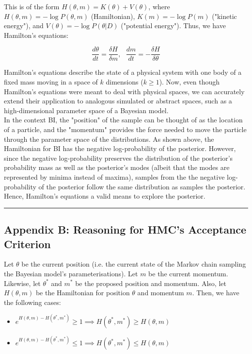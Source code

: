 \documentclass[conference]{IEEEtran}
\begin{document}
This is of the form $H(\theta, m) = K(\theta) + V(\theta)$, where $H(\theta, m) = - \log P(\theta, m)$ (Hamiltonian),  $K(m) = - \log P(m)$ ("kinetic energy"), and $V(\theta) = - \log P(\theta|D)$ ("potential energy"). Thus, we have Hamilton's equations:

\begin{equation*}
	\frac{d \theta}{dt} = \frac{\delta H}{\delta m}, \text{ } \frac{dm}{dt} = - \frac{\delta H}{\delta \theta}
\end{equation*}

Hamilton's equations describe the state of a physical system with one body of a fixed mass moving in a space of $k$ dimensions ($k \geq 1$). Now, even though Hamilton's equations were meant to deal with physical spaces, we can accurately extend their application to analogous simulated or abstract spaces, such as a high-dimensional parameter space of a Bayesian model.\\

In the context BI, the "position" of the sample can be thought of as the location of a particle, and the "momentum" provides the force needed to move the particle through the parameter space of the distributions. As shown above, the Hamiltonian for BI has the negative log-probability of the posterior. However, since the negative log-probability preserves the distribution of the posterior's probability mass as well as the posterior's modes (albeit that the modes are represented by minima instead of maxima), samples from the the negative log-probability of the posterior follow the same distribution as samples the posterior. Hence, Hamilton's equations a valid means to explore the posterior.

\par\noindent\rule{0.49\textwidth}{0.1pt}

\subsection*{Appendix B: Reasoning for HMC's Acceptance Criterion}
Let $\theta$ be the current position (i.e. the current state of the Markov chain sampling the Bayesian model's parameterisations). Let $m$ be the current momentum. Likewise, let $\theta^*$ and $m^*$ be the proposed position and momentum. Also, let $H(\theta, m)$ be the Hamiltonian for position $\theta$ and momentum $m$. Then, we have the following cases:\\

\begin{itemize}
	\item $e^{H(\theta, m) - H(\theta^*, m^*)} \geq 1 \implies H(\theta^*, m^*) \geq H(\theta, m)$
	\item $e^{H(\theta, m) - H(\theta^*, m^*)} \leq 1 \implies H(\theta^*, m^*) \leq H(\theta, m)$\\
\end{itemize}
\end{document}
